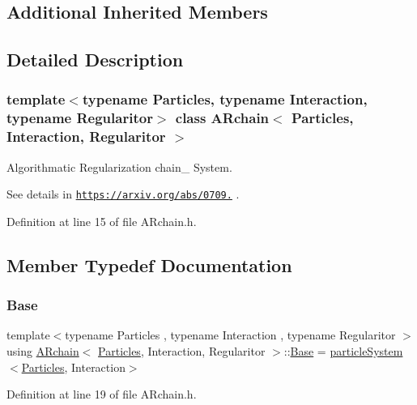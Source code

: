 \subsection*{Additional Inherited Members}


\subsection{Detailed Description}
\subsubsection*{template$<$typename Particles, typename Interaction, typename Regularitor$>$\newline
class A\+Rchain$<$ Particles, Interaction, Regularitor $>$}

Algorithmatic Regularization chain_ System.

See details in \href{https://arxiv.org/abs/0709.3367}{\tt https\+://arxiv.\+org/abs/0709.} . 

Definition at line 15 of file A\+Rchain.\+h.



\subsection{Member Typedef Documentation}
\mbox{\label{class_a_rchain_a59c554d5529dc8d1558eb263699bfa24}} 
\subsubsection{\texorpdfstring{Base}{Base}}
{\footnotesize\ttfamily template$<$typename Particles , typename Interaction , typename Regularitor $>$ \\
using \mbox{\hyperlink{class_a_rchain}{A\+Rchain}}$<$ \mbox{\hyperlink{struct_particles}{Particles}}, Interaction, Regularitor $>$\+::\mbox{\hyperlink{class_a_rchain_a59c554d5529dc8d1558eb263699bfa24}{Base}} =  \mbox{\hyperlink{classparticle_system}{particle\+System}}$<$\mbox{\hyperlink{struct_particles}{Particles}}, Interaction$>$}



Definition at line 19 of file A\+Rchain.\+h.

\mbox{\label{class_a_rchain_a048c8855064f452c7d6d061531a084ed}} 

